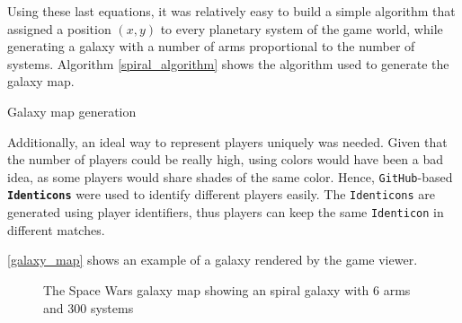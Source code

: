 \documentclass[a4paper,11pt,titlepage,abstract,numbers=noenddot,automark,mnsy,intlimits,rgb,dvipsnames]{report}
\begin{document}
Using these last equations, it was relatively easy to build a simple algorithm that assigned a position $(x, y)$ to every
planetary system of the game world, while generating a galaxy with a number of arms proportional to the number of systems.
Algorithm \autoref{spiral_algorithm} shows the algorithm used to generate the galaxy map.
\begin{algorithm}[H]
\caption{Galaxy map generation}
\label{spiral_algorithm}
\begin{algorithmic}
\ENDIF
\ENDFOR
\end{algorithmic}
\end{algorithm}
Additionally, an ideal way to represent players uniquely was needed. Given that the number
of players could be really high, using colors would have been a bad idea, as some players would share shades of the same
color. Hence, \texttt{GitHub}-based \textbf{\texttt{Identicons}} \cite{identicons} were used to identify different players easily. The \texttt{Identicons} are
generated using player identifiers, thus players can keep the same \texttt{Identicon} in different matches.

\autoref{galaxy_map} shows an example of a galaxy rendered by the game viewer.
\begin{figure}[H]
\begin{center}
\noindent{}
\end{center}
\caption{The Space Wars galaxy map showing an spiral galaxy with 6 arms and 300 systems}
\label{galaxy_map}
\end{figure}
\end{document}
